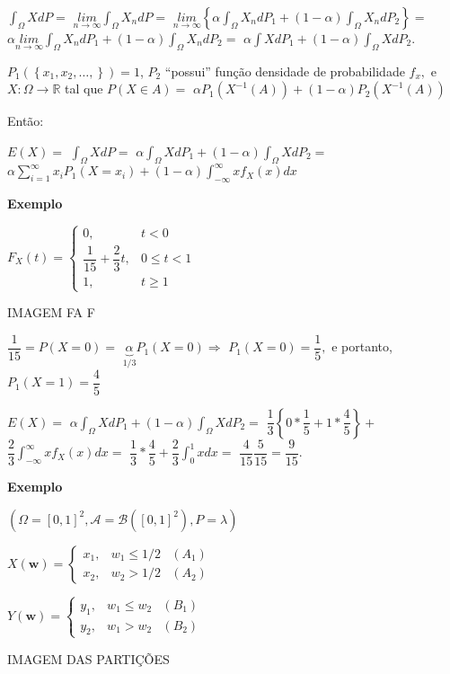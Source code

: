 \documentclass[
]{book}
\begin{document}
\(\int_\Omega XdP=\) \(\underset{n\rightarrow\infty}{lim}\int_\Omega X_n dP=\) \(\underset{n\rightarrow\infty}{lim}\left\{\alpha\int_\Omega X_ndP_1+(1-\alpha)\int_\Omega X_ndP_2\right\}=\) \(\alpha \underset{n\rightarrow\infty}{lim}\int_\Omega X_ndP_1 + (1-\alpha)\int_\Omega X_n dP_2=\) \(\alpha \int XdP_1 + (1-\alpha)\int_\Omega XdP_2.\)

\(P_1(\left\{x_1,x_2,\ldots,\right\})=1\), \(P_2\) ``possui'' função densidade de probabilidade \(f_x,\) e \(X:\Omega \longrightarrow \mathbb{R}\) tal que \(P(X \in A)=\) \(\alpha P_1(X^{-1}(A))+(1-\alpha)P_2(X^{-1}(A))\)

Então:

\(E(X)=\) \(\int_\Omega XdP=\) \(\alpha \int_\Omega XdP_1 + (1-\alpha)\int_\Omega XdP_2=\) \(\alpha \sum_{i=1}^\infty x_iP_1(X=x_i)+(1-\alpha)\int_{-\infty}^\infty x f_X(x)dx\)

\textbf{Exemplo}

\(F_X(t)=\left\{\begin{array}{ll} 0, & t<0\\ \dfrac{1}{15}+\dfrac{2}{3}t, & 0\leq t < 1\\ 1, & t \geq 1\end{array}\right.\)

IMAGEM FA F

\(\dfrac{1}{15}=P(X=0)=\) \(\underbrace{\alpha}_{1/3} P_1(X=0) \Rightarrow\) \(P_1(X=0)=\dfrac{1}{5},\) e portanto, \(P_1(X=1)=\dfrac{4}{5}\)

\(E(X) =\) \(\alpha\int_\Omega XdP_1+(1-\alpha)\int_\Omega X dP_2=\) \(\dfrac{1}{3}\left\{0*\dfrac{1}{5}+1*\dfrac{4}{5}\right\}+\) \(\dfrac{2}{3}\int_{-\infty}^\infty x f_X(x)dx=\) \(\dfrac{1}{3}*\dfrac{4}{5}+\dfrac{2}{3}\int_0^1 xdx=\) \(\dfrac{4}{15}\dfrac{5}{15}=\dfrac{9}{15}.\)

\textbf{Exemplo}

\((\Omega=[0,1]^2, \mathcal{A}=\mathcal{B}([0,1]^2),P=\lambda)\)

\(X(\boldsymbol w)=\left\{\begin{array}{lll} x_1, & w_1 \leq 1/2 & (A_1)\\ x_2, & w_2 > 1/2 & (A_2)\end{array}\right.\)

\(Y(\boldsymbol w)=\left\{\begin{array}{lll} y_1, & w_1 \leq w_2 & (B_1)\\ y_2, & w_1 > w_2& (B_2)\end{array}\right.\)

IMAGEM DAS PARTIÇÕES
\end{document}
